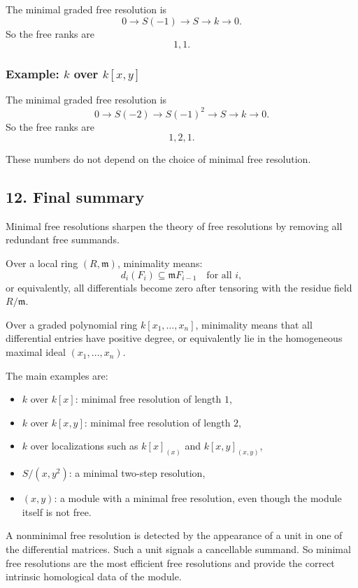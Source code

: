 \documentclass[12pt,a4paper]{article}
\theoremstyle{notespace}
\theoremstyle{definition}
\begin{document}
The minimal graded free resolution is
\[
0 \longrightarrow S(-1) \longrightarrow S \longrightarrow k \longrightarrow 0.
\]
So the free ranks are
\[
1,1.
\]

\subsubsection*{Example: \(k\) over \(k[x,y]\)}

The minimal graded free resolution is
\[
0 \longrightarrow S(-2) \longrightarrow S(-1)^2 \longrightarrow S \longrightarrow k \longrightarrow 0.
\]
So the free ranks are
\[
1,2,1.
\]

These numbers do not depend on the choice of minimal free resolution.

\subsection{12. Final summary}

Minimal free resolutions sharpen the theory of free resolutions by removing all redundant free summands.

Over a local ring \((R,\mathfrak m)\), minimality means:
\[
d_i(F_i)\subseteq \mathfrak m F_{i-1}
\quad\text{for all } i,
\]
or equivalently, all differentials become zero after tensoring with the residue field \(R/\mathfrak m\).

Over a graded polynomial ring \(k[x_1,\dots,x_n]\), minimality means that all differential entries have positive degree, or equivalently lie in the homogeneous maximal ideal \((x_1,\dots,x_n)\).

The main examples are:
\begin{itemize}
	\item \(k\) over \(k[x]\): minimal free resolution of length \(1\),
	\item \(k\) over \(k[x,y]\): minimal free resolution of length \(2\),
	\item \(k\) over localizations such as \(k[x]_{(x)}\) and \(k[x,y]_{(x,y)}\),
	\item \(S/(x,y^2)\): a minimal two-step resolution,
	\item \((x,y)\): a module with a minimal free resolution, even though the module itself is not free.
\end{itemize}

A nonminimal free resolution is detected by the appearance of a unit in one of the differential matrices.
Such a unit signals a cancellable summand.
So minimal free resolutions are the most efficient free resolutions and provide the correct intrinsic homological data of the module.
\end{document}
